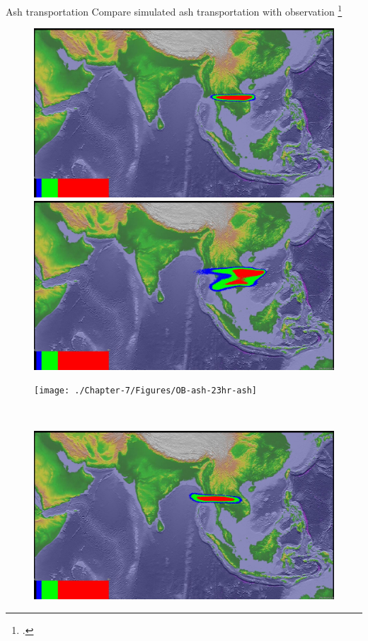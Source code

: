 \documentclass{beamer}
\begin{document}
\begin{frame}{Ash transportation}
Compare simulated ash transportation with observation \footcite{guo2004particles}
\begin{figure}[!htb]
    \centering
    \begin{minipage}{.293\textwidth}
        \centering
        \includegraphics[width=0.99 \textwidth]{./Chapter-7/Figures/bent-23hr-ash}
    \end{minipage}%
    \begin{minipage}{.293\textwidth}
        \centering
        \includegraphics[width=0.99 \textwidth]{./Chapter-7/Figures/SPH-Plume-23hr-ash}
    \end{minipage}%
    \begin{minipage}{.293\textwidth}
        \centering
        \texttt{[image: ./Chapter-7/Figures/OB-ash-23hr-ash]}
    \end{minipage}%
    \\
        \begin{minipage}{.293\textwidth}
        \centering
        \includegraphics[width=0.99 \textwidth]{./Chapter-7/Figures/bent-31hr-ash}

\end{minipage}
\end{figure}
\end{frame}
\end{document}
